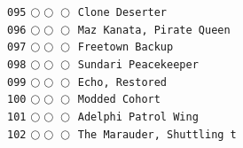 \documentclass[a4paper,landscape]{article}
\begin{document}
\begin{multicols*}{5}
\texttt{095} \(\bigcirc\!\bigcirc\!\bigcirc\)  \texttt{Clone Deserter} \vspace{-0.3mm}\\ 
\texttt{096} \(\bigcirc\!\bigcirc\!\bigcirc\)  \texttt{Maz Kanata, Pirate Queen} \vspace{-0.3mm}\\ 
\texttt{097} \(\bigcirc\!\bigcirc\!\bigcirc\)  \texttt{Freetown Backup} \vspace{-0.3mm}\\ 
\texttt{098} \(\bigcirc\!\bigcirc\!\bigcirc\)  \texttt{Sundari Peacekeeper} \vspace{-0.3mm}\\ 
\texttt{099} \(\bigcirc\!\bigcirc\!\bigcirc\)  \texttt{Echo, Restored} \vspace{-0.3mm}\\ 
\texttt{100} \(\bigcirc\!\bigcirc\!\bigcirc\)  \texttt{Modded Cohort} \vspace{-0.3mm}\\ 
\texttt{101} \(\bigcirc\!\bigcirc\!\bigcirc\)  \texttt{Adelphi Patrol Wing} \vspace{-0.3mm}\\ 
\texttt{102} \(\bigcirc\!\bigcirc\!\bigcirc\)  \texttt{The Marauder, Shuttling t} \vspace{-0.3mm}\\ 

\end{multicols*}
\end{document}
